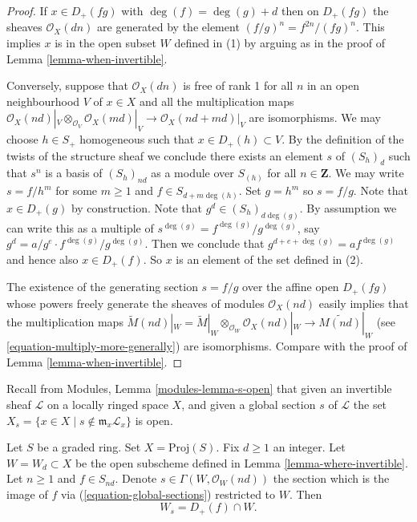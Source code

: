 \begin{proof}
If $x \in D_{+}(fg)$ with $\deg(f) = \deg(g) + d$ then
on $D_{+}(fg)$ the sheaves $\mathcal{O}_X(dn)$
are generated by the element $(f/g)^n = f^{2n}/(fg)^n$. This implies $x$
is in the open subset $W$ defined in (1) by arguing as in the
proof of Lemma \ref{lemma-when-invertible}.

\medskip\noindent
Conversely, suppose that $\mathcal{O}_X(dn)$ is free of rank 1
for all $n$ in an open neighbourhood $V$ of $x \in X$ and all the
multiplication maps
$\mathcal{O}_X(nd)|_V \otimes_{\mathcal{O}_V} \mathcal{O}_X(md)|_V
\to \mathcal{O}_X(nd + md)|_V$ are isomorphisms.
We may choose $h \in S_{+}$ homogeneous such that $x \in D_{+}(h) \subset V$.
By the definition of the twists of the structure sheaf we conclude there
exists an element $s$ of $(S_h)_d$ such that $s^n$ is a basis of $(S_h)_{nd}$
as a module over $S_{(h)}$ for all $n \in \mathbf{Z}$.
We may write
$s = f/h^m$ for some $m \geq 1$ and $f \in S_{d + m \deg(h)}$.
Set $g = h^m$ so $s = f/g$. Note that $x \in D_{+}(g)$ by construction.
Note that $g^d \in (S_h)_{d\deg(g)}$.
By assumption we can write this as a multiple of
$s^{\deg(g)} = f^{\deg(g)}/g^{\deg(g)}$, say
$g^d = a/g^e \cdot f^{\deg(g)}/g^{\deg(g)}$.
Then we conclude that $g^{d + e + \deg(g)} = a f^{\deg(g)}$
and hence also $x \in D_{+}(f)$. So $x$ is an element of the set defined
in (2).

\medskip\noindent
The existence of the generating section $s = f/g$ over
the affine open $D_{+}(fg)$ whose
powers freely generate the sheaves of modules
$\mathcal{O}_X(nd)$ easily implies that the multiplication maps
$\widetilde M(nd)|_W = \widetilde M|_W \otimes_{\mathcal{O}_W}
\mathcal{O}_X(nd)|_W \to \widetilde{M(nd)}|_W$
(see \ref{equation-multiply-more-generally})
are isomorphisms. Compare with the proof of Lemma \ref{lemma-when-invertible}.
\end{proof}

\noindent
Recall from Modules, Lemma \ref{modules-lemma-s-open}
that given an invertible sheaf $\mathcal{L}$ on a locally ringed
space $X$, and given a global section $s$ of $\mathcal{L}$
the set $X_s = \{x \in X \mid s \not \in \mathfrak m_x\mathcal{L}_x\}$
is open.

\begin{lemma}
\label{lemma-principal-open}
Let $S$ be a graded ring. Set $X = \text{Proj}(S)$. Fix $d \geq 1$ an
integer. Let $W = W_d \subset X$ be the open subscheme defined in
Lemma \ref{lemma-where-invertible}. Let $n \geq 1$ and $f \in S_{nd}$.
Denote $s \in \Gamma(W, \mathcal{O}_W(nd))$ the section which is
the image of $f$ via (\ref{equation-global-sections}) restricted to $W$. Then
$$
W_s = D_{+}(f) \cap W.
$$
\end{lemma}

